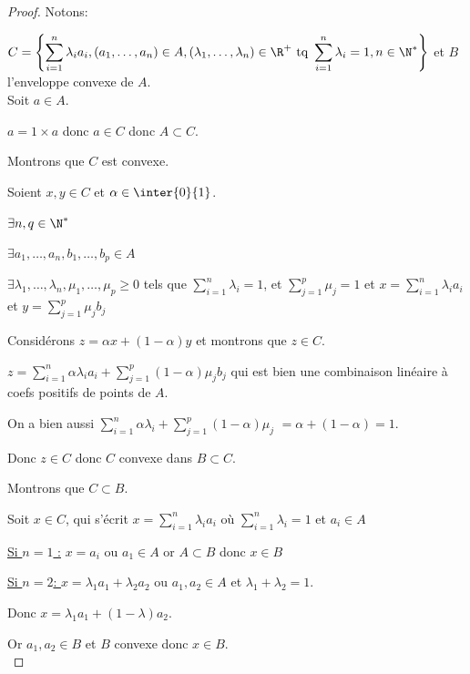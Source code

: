 \begin{proof}
    Notons:
    
    $\displaystyle C = \left\{\sum_{i = 1}^n \lambda_i a_i, (a_1, \dots, a_n) \in A, (\lambda_1, \dots, \lambda_n) \in \R^+ \text{ tq } \sum_{i = 1}^n \lambda_i = 1, n \in \N^*\right\}$
    et $B$ l'enveloppe convexe de $A$. \\

    Soit $a \in A$. 

    $a = 1 \times a$ donc $a \in C$ donc $A \subset C$. 

    Montrons que $C$ est convexe. 

    Soient $x, y \in C$ et $\alpha \in \inter{0}{1}$. 

    $\exists n, q \in \N^*$

    $\exists a_1, \dots, a_n, b_1, \dots, b_p \in A$

    $\exists \lambda_1, \dots, \lambda_n, \mu_1, \dots, \mu_p \geqslant 0$ tels que 
    $\displaystyle \sum_{i = 1}^{n} \lambda_i = 1$, et $\displaystyle \sum_{j = 1}^{p} \mu_j = 1$ et 
    $\displaystyle x = \sum_{i = 1}^{n }\lambda_i a_i$ et $\displaystyle y = \sum_{j = 1}^{p } \mu_j b_j$

    Considérons $z = \alpha x + (1 - \alpha)y$ et montrons que $z \in C$. 

    $\displaystyle z = \sum_{i = 1}^{n} \alpha \lambda_i a_i + \sum_{j = 1}^{p } (1 - \alpha) \mu_j b_j$
    qui est bien une combinaison linéaire à coefs positifs de points de $A$. 

    On a bien aussi $\displaystyle \sum_{i = 1}^{n } \alpha \lambda_i + \sum_{j = 1}^{p } (1 - \alpha) \mu_j$
    $ = \alpha + (1 - \alpha) = 1$. 

    Donc $z \in C$ donc $C$ convexe dans $B \subset C$. 

    Montrons que $C \subset B$. 

    Soit $x \in C$, qui s'écrit $\displaystyle x = \sum_{ i = 1}^{n }\lambda_i a_i$ où 
    $\displaystyle \sum_{i = 1}^{n } \lambda_i = 1$ et $a_i \in A$

    \underline{Si $n = 1$ :} $x = a_i$ ou $a_1 \in A$
    or $A \subset B$ donc $x \in B$

    \underline{Si $n = 2$: } $x = \lambda_1 a_1 + \lambda_2 a_2$ ou $a_1, a_2 \in A$ et 
    $\lambda_1 + \lambda_2 = 1$. 

    Donc $x = \lambda_1 a_1 + (1 - \lambda)a_2$. 

    Or $a_1, a_2 \in B$ et $B$ convexe donc $x \in B$. \\


\end{proof}

